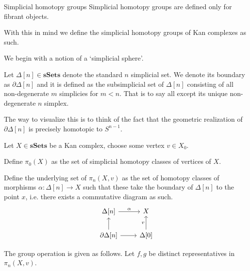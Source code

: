 \documentclass[10pt]{beamer}
\begin{document}
\begin{frame}{Simplicial homotopy groups}
		Simplicial homotopy groups are defined only for fibrant objects.
			
		With this in mind we define the simplicial homotopy groups of Kan complexes as such.
		
		We begin with a notion of a `simplicial sphere'.
		\begin{definition}
			Let \( \Delta[n]\in \mathbf{sSets} \) denote the standard \( n \) simplicial set. We denote its boundary as \( \partial \Delta[n] \) and it is defined as the subsimplicial set of \( \Delta[n] \) consisting of all non-degenerate \( m \) simplicies for \( m <n \). That is to say all except its unique non-degenerate  \( n \) simplex.
		\end{definition}
		
		The way to visualize this is to think of the fact that the geometric realization of \( \partial \Delta[n] \) is precisely homotopic to \( S^{n-1} \).
		
		\begin{definition}
			Let \( X \in \mathbf{sSets} \) be a Kan complex, choose some vertex \( v \in X_0 \).
			
			Define \( \pi_0(X)  \) as the set of simplicial homotopy classes of vertices of \( X \).
			
			Define the underlying set of \(\pi_n(X,v) \) as the set of homotopy classes of morphisms \( \alpha: \Delta[n] \to X \) such that these take the boundary of \( \Delta[n] \) to the point \( x \), i.e. there exists a commutative diagram as such.
			\[\begin{tikzcd}
				{\Delta[n]} & X \\
				{\partial \Delta[n]} & {\Delta[0]}
				\arrow["\alpha", from=1-1, to=1-2]
				\arrow[from=2-1, to=1-1]
				\arrow[from=2-1, to=2-2]
				\arrow["v",from=2-2, to=1-2]
			\end{tikzcd}\]
			
		\end{definition}
		
		The group operation is given as follows. Let \( f, g \) be distinct representatives in \( \pi_n(X,v) \).
		

\end{frame}
\end{document}
